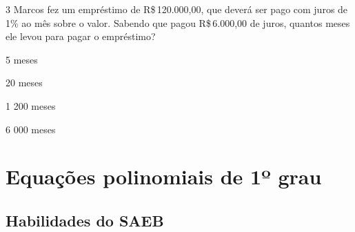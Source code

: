 

\num{3} Marcos fez um empréstimo de R\$\,120.000,00, que deverá ser pago com
juros de 1\% ao mês sobre o valor. Sabendo que pagou R\$\,6.000,00 de
juros, quantos meses ele levou para pagar o empréstimo?

\begin{escolha}
\item 5 meses
\item 20 meses
\item 1 200 meses
\item 6 000 meses
\end{escolha}












\chapter{Equações polinomiais de 1º grau}

\section{Habilidades do SAEB} 

